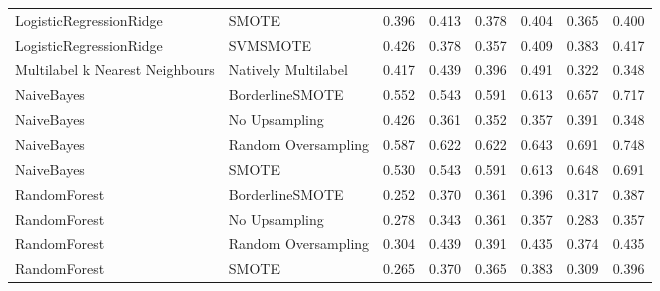 \begin{tabular}{llllllll}
        LogisticRegressionRidge &                         SMOTE & 0.396 &                     0.413 &                 0.378 &                  0.404 &                                   0.365 &     0.400 \\
        LogisticRegressionRidge &                      SVMSMOTE & 0.426 &                     0.378 &                 0.357 &                  0.409 &                                   0.383 &     0.417 \\
Multilabel k Nearest Neighbours &           Natively Multilabel & 0.417 &                     0.439 &                 0.396 &                  0.491 &                                   0.322 &     0.348 \\
                     NaiveBayes &               BorderlineSMOTE & 0.552 &                     0.543 &                 0.591 &                  0.613 &                                   0.657 &     0.717 \\
                     NaiveBayes &                 No Upsampling & 0.426 &                     0.361 &                 0.352 &                  0.357 &                                   0.391 &     0.348 \\
                     NaiveBayes &           Random Oversampling & 0.587 &                     0.622 &                 0.622 &                  0.643 &                                   0.691 &     0.748 \\
                     NaiveBayes &                         SMOTE & 0.530 &                     0.543 &                 0.591 &                  0.613 &                                   0.648 &     0.691 \\
                   RandomForest &               BorderlineSMOTE & 0.252 &                     0.370 &                 0.361 &                  0.396 &                                   0.317 &     0.387 \\
                   RandomForest &                 No Upsampling & 0.278 &                     0.343 &                 0.361 &                  0.357 &                                   0.283 &     0.357 \\
                   RandomForest &           Random Oversampling & 0.304 &                     0.439 &                 0.391 &                  0.435 &                                   0.374 &     0.435 \\
                   RandomForest &                         SMOTE & 0.265 &                     0.370 &                 0.365 &                  0.383 &                                   0.309 &     0.396 \\

\end{tabular}
